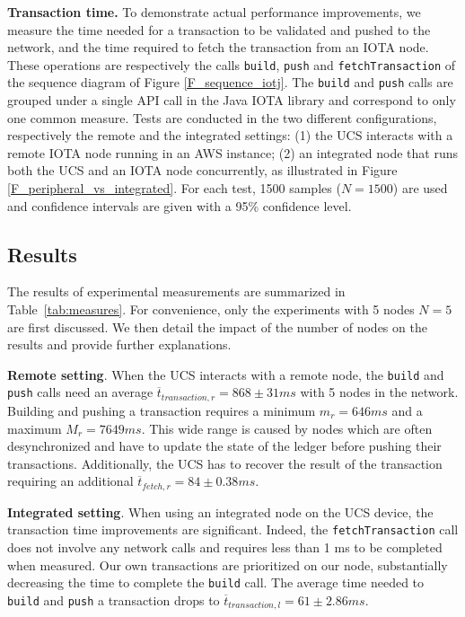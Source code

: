 \textbf{Transaction time.}
To demonstrate actual performance improvements, we measure the time needed for a transaction to be validated and pushed to the network, and the time required to fetch the transaction from an IOTA node. These operations are respectively the calls \texttt{build}, \texttt{push} and \texttt{fetchTransaction} of the sequence diagram of Figure \ref{F_sequence_iotj}. The \texttt{build} and \texttt{push} calls are grouped under a single API call in the Java IOTA library and correspond to only one common measure.
Tests are conducted in the two different configurations, respectively the remote and the integrated settings: (1) the UCS interacts with a remote IOTA node running in an AWS instance; (2) an integrated node that runs both the UCS and an IOTA node concurrently, as illustrated in Figure \ref{F_peripheral_vs_integrated}.
For each test, 1500 samples ($N=1500$) are used and confidence intervals are given with a 95\% confidence level.

\subsection{Results}
\label{ss_results}

The results of experimental measurements are summarized in Table~\ref{tab:measures}. For convenience, only the experiments with 5 nodes $N=5$ are first discussed. We then detail the impact of the number of nodes on the results and provide further explanations.

\textbf{Remote setting}. When the UCS interacts with a remote node, the \texttt{build} and \texttt{push} calls need an average $\overline{t}_{transaction, r} =868\pm 31 ms$ with 5 nodes in the network. Building and pushing a transaction requires a minimum $m_{r}=646 ms$ and a maximum $M_{r}=7649 ms$. This wide range is caused by nodes which are often desynchronized and have to update the state of the ledger before pushing their transactions. 
Additionally, the UCS has to recover the result of the transaction requiring an additional $\overline{t}_{fetch, r} = 84\pm0.38ms$.

\textbf{Integrated setting}. When using an integrated node on the UCS device, the transaction time improvements are significant. Indeed, the \texttt{fetchTransaction} call does not involve any network calls and requires less than 1 ms to be completed when measured. Our own transactions are prioritized on our node, substantially decreasing the time to complete the \texttt{build} call. The average time needed to \texttt{build} and \texttt{push} a transaction drops to $\overline{t}_{transaction, l}=61\pm2.86ms$.


